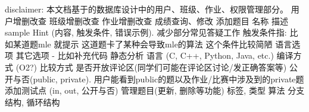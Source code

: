 \markdownRendererInterblockSeparator
{}disclaimer: 本文档基于的数据库设计中的用户、班级、作业、权限管理部分。\markdownRendererInterblockSeparator
{}\markdownRendererInterblockSeparator
{}\markdownRendererInterblockSeparator
{}\markdownRendererUlBeginTight
\markdownRendererUlItem 用户增删改查\markdownRendererUlItemEnd 
\markdownRendererUlItem 班级增删改查\markdownRendererUlItemEnd 
\markdownRendererUlItem 作业增删改查\markdownRendererUlItemEnd 
\markdownRendererUlItem 成绩查询、修改\markdownRendererUlItemEnd 
\markdownRendererUlEndTight \markdownRendererInterblockSeparator
{}\markdownRendererInterblockSeparator
{}\markdownRendererUlBeginTight
\markdownRendererUlItem 添加题目\markdownRendererUlItemEnd 
\markdownRendererUlItem 名称\markdownRendererUlItemEnd 
\markdownRendererUlItem 描述\markdownRendererUlItemEnd 
\markdownRendererUlItem sample\markdownRendererUlItemEnd 
\markdownRendererUlItem Hint (内容, 触发条件, 错误示例). 减少部分常见答疑工作\markdownRendererInterblockSeparator
{}\markdownRendererUlBeginTight
\markdownRendererUlItem 触发条件指: 比如某道题mle 就提示 这道题卡了某种会导致mle的算法\markdownRendererUlItemEnd 
\markdownRendererUlItem 这个条件比较简陋\markdownRendererUlItemEnd 
\markdownRendererUlEndTight \markdownRendererUlItemEnd 
\markdownRendererUlItem 语言选项\markdownRendererInterblockSeparator
{}\markdownRendererUlBeginTight
\markdownRendererUlItem 其它选项 - 比如补充代码\markdownRendererUlItemEnd 
\markdownRendererUlItem 静态分析\markdownRendererUlItemEnd 
\markdownRendererUlItem 语言 (C, C++, Python, Java, etc.)\markdownRendererUlItemEnd 
\markdownRendererUlItem 编译方式 (O2?)\markdownRendererUlItemEnd 
\markdownRendererUlItem 比较方式\markdownRendererUlItemEnd 
\markdownRendererUlEndTight \markdownRendererUlItemEnd 
\markdownRendererUlItem 是否开放评论区(同学们可能在评论区讨论/发正确答案等)\markdownRendererUlItemEnd 
\markdownRendererUlItem 公开与否(public, private). 用户能看到public的题以及作业/比赛中涉及到的private题\markdownRendererUlItemEnd 
\markdownRendererUlItem 添加测试点 (in, out, 公开与否)\markdownRendererUlItemEnd 
\markdownRendererUlItem 管理题目(更新, 删除等功能)\markdownRendererUlItemEnd 
\markdownRendererUlItem 标签, 类型\markdownRendererUlItemEnd 
\markdownRendererUlItem 算法\markdownRendererUlItemEnd 
\markdownRendererUlItem 分支结构, 循环结构\markdownRendererUlItemEnd 
